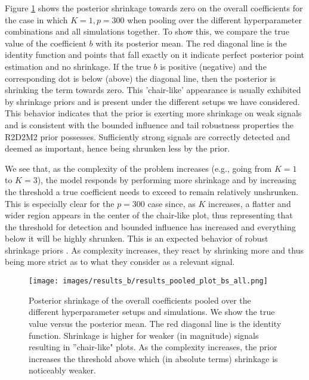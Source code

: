  Figure \ref{fig:posteriorbshrinkage} shows the posterior shrinkage towards zero on the overall coefficients for the case in which $K=1,p=300$ when pooling over the different hyperparameter combinations and all simulations together. To show this, we compare the true value of the coefficient $b$ with its posterior mean. The red diagonal line is the identity function and points that fall exactly on it indicate perfect posterior point estimation and no shrinkage. If the true $b$ is positive (negative) and the corresponding dot is below (above) the diagonal line, then the posterior is shrinking the term towards zero. This 'chair-like' appearance is usually exhibited by shrinkage priors \citep[see][for more details]{Horseshoe, BayesPenalizedRegSara} and is present under the different setups we have considered. This behavior indicates that the prior is exerting more shrinkage on weak signals and is consistent with the bounded influence and tail robustness properties the R2D2M2 prior possesses. Sufficiently strong signals are correctly detected and deemed as important, hence being shrunken less by the prior.

We see that, as the complexity of the problem increases (e.g., going from $K=1$ to $K=3$), the model responds by performing more shrinkage and by increasing the threshold a true coefficient needs to exceed to remain relatively unshrunken. This is especially clear for the $p=300$ case since, as $K$ increases, a flatter and wider region appears in the center of the chair-like plot, thus representing that the threshold for detection and bounded influence has increased and everything below it will be highly shrunken. This is an expected behavior of robust shrinkage priors \citep{Horseshoe}. As complexity increases, they react by shrinking more and thus being more strict as to what they consider as a relevant signal.
 \begin{figure}[t!]%
	\centering
	\texttt{[image: images/results\_b/results\_pooled\_plot\_bs\_all.png]}
	\caption{Posterior shrinkage of the overall coefficients pooled over the different hyperparameter setups and simulations. We show the true value versus the posterior mean. The red diagonal line is the identity function. Shrinkage is higher for weaker (in magnitude) signals resulting in ''chair-like" plots. As the complexity increases, the prior increases the threshold above which (in absolute terms) shrinkage is noticeably weaker. }
	\label{fig:posteriorbshrinkage}
\end{figure}
%
